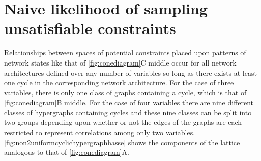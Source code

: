 \section{Naive likelihood of sampling unsatisfiable constraints}\label{sec:volrat}
Relationships between spaces of potential constraints placed upon patterns of network states like that of \ref{fig:conediagram}C middle occur for all network architectures defined over any number of variables so long as there exists at least one cycle in the corresponding network architecture. For the case of three variables, there is only one class of graphs containing a cycle, which is that of \ref{fig:conediagram}B middle. For the case of four variables there are nine different classes of hypergraphs containing cycles and these nine classes can be split into two groups depending upon whether or not the edges of the graphs are each restricted to represent correlations among only two variables. \ref{fig:non2uniformcyclichypergraphhasse} shows the components of the lattice analogous to that of \ref{fig:conediagram}A.

